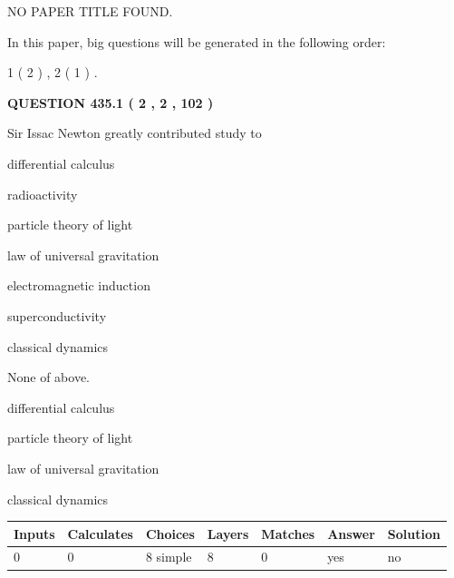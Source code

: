 \documentclass[12pt]{article}
\begin{document}
   
\vspace{0.2in}
   
   
   
   
   
   
 NO PAPER TITLE FOUND.
   
   
   
\vspace{0.2in}
   
In this paper, big questions will be generated in the following order: 
   
   
   1 ( 2 )
 ,
   2 ( 1 )
 .
  
\vspace{0.2in}
  
{\textbf{\Large{QUESTION
435.1 
 ( 2 , 2 , 102 )
}}}
  
  
Sir Issac Newton greatly contributed study to
 
 
differential calculus
 
 
radioactivity
 
 
particle theory of light
 
 
law of universal gravitation
 
 
electromagnetic induction
 
 
superconductivity
 
 
classical dynamics
 
 
 None of above.
 
 
\noindent{}
 
 
differential calculus
 
 
particle theory of light
 
 
law of universal gravitation
 
 
classical dynamics
 
 
\noindent{}
 
 
   
   
   
   
\noindent\begin{tabular}{|l|l|l|l|l|l|l|}
 \hline
Inputs & Calculates & Choices & Layers & Matches & Answer & Solution \\ \hline
 0  & 
 0  & 
 8
  simple  
  & 
 8  & 
 0  & 
  yes & 
  no 
  \\ \hline
 \end{tabular}
   
\end{document}
